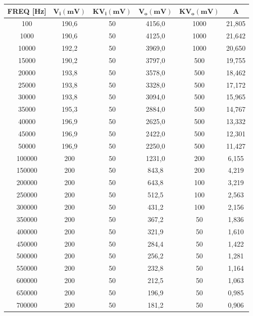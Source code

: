 \begin{table}[!ht]
    \centering
    \begin{tabular}{|c|c|c|c|c|c|}
    \hline

        \textbf{FREQ [Hz]} & $\bm{V_i(mV)}$ & $\bm{KV_i(mV)}$ & $\bm{V_o(mV)}$ & $\bm{KV_o(mV)}$ & \textbf{A} \\ \hline

      
        100 & 190,6 & 50 & 4156,0 & 1000 & 21,805  \\ \hline
        1000 & 190,6 & 50 & 4125,0 & 1000 & 21,642  \\ \hline
        10000 & 192,2 & 50 & 3969,0 & 1000 & 20,650 \\ \hline
        15000 & 190,2 & 50 & 3797,0 & 500 & 19,755  \\ \hline
        20000 & 193,8 & 50 & 3578,0 & 500 & 18,462 \\ \hline
        25000 & 193,8 & 50 & 3328,0 & 500 & 17,172  \\ \hline
        30000 & 193,8 & 50 & 3094,0 & 500 & 15,965  \\ \hline
        35000 & 195,3 & 50 & 2884,0 & 500 & 14,767  \\ \hline
        40000 & 196,9 & 50 & 2625,0 & 500 & 13,332  \\ \hline
        45000 & 196,9 & 50 & 2422,0 & 500 & 12,301  \\ \hline
        50000 & 196,9 & 50 & 2250,0 & 500 & 11,427  \\ \hline
        100000 & 200 & 50 & 1231,0 & 200 & 6,155  \\ \hline
        150000 & 200 & 50 & 843,8 & 200 & 4,219  \\ \hline
        200000 & 200 & 50 & 643,8 & 100 & 3,219  \\ \hline
        250000 & 200 & 50 & 512,5 & 100 & 2,563  \\ \hline
        300000 & 200 & 50 & 431,2 & 100 & 2,156  \\ \hline
        350000 & 200 & 50 & 367,2 & 50 & 1,836	\\ \hline																				
        400000	& 200 & 50 & 321,9 & 50 & 1,610	\\ \hline																			
        450000	& 200	& 50	& 284,4	& 50	& 1,422 \\ \hline													
        500000 &	200 &	50 &	256,2 &	50 &	1,281	\\ \hline							
        550000 &	200 &	50 &	232,8 &	50 &	1,164 \\ \hline																		
        600000 &	200 &	50 &	212,5 &	50 &	1,063	\\ \hline																
        650000 &	200 &	50 &	196,9 &	50 &	0,985 \\ \hline																
        700000 &	200 &	50 &	181,2 &	50 &	0,906	\\ \hline																
        
    \end{tabular}
\end{table}


